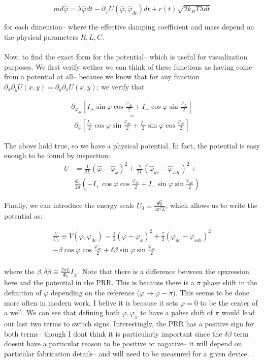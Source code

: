 \documentclass[paper=a4, twocolumn, fontsize=10pt]{article} %
\numberwithin{equation}{section} %
\numberwithin{figure}{section} %
\numberwithin{table}{section} %
\def \df#1{\hat{#1}}
\begin{document}
\[ m d \dot{\df\varphi} = \lambda \dot{\df\varphi} dt - \partial_{\df\varphi} U(\df\varphi, \df\varphi_{dc}) dt + r(t) \sqrt{2 k_B T \lambda dt} \]

for each dimension-- where the effective damping coefficient and mass depend on the physical parameters $R,L,C$.
\\
\\
Now, to find the exact form for the potential-- which is useful for visualization purposes. We first verify wether we can think of these functions as having come from a potential at all-- because we know that for any function $\partial_{x} \partial_{y} U(x,y) = \partial_{y} \partial_{x} U(x,y)$; we verify that

\begin{align}
 \partial_{\df\varphi_{dc}}\left[I_{+} \sin \varphi \cos \frac{\varphi_{dc}}{2} + I_{-} \cos \varphi \sin \frac{\varphi_{dc}}{2}\right]
\end{align}
\[=\]
\begin{align} 
    \partial_{\df\varphi}\left[\frac{I_{+}}{2} \cos \varphi \sin \frac{\varphi_{dc}}{2} + \frac{I_{-}}{2} \sin \varphi \cos \frac{\varphi_{dc}}{2}\right]
\end{align}

The above hold true, so we have a physical potential. In fact, the potential is easy enough to be found by inspection: 
\begin{align}
U &= \frac{1}{2L} (\df\varphi-\df\varphi_x)^2 + \frac{\gamma}{2L} (\df\varphi_{dc}-\df\varphi_{xdc})^2 + \\
 &\frac{\Phi_0}{2\pi}  \left( - I_+ \cos \varphi \cos \frac{\varphi_{dc}}{2} + I_- \sin \varphi \sin \frac{\varphi_{dc}}{2}\right)
\end{align}

Finally, we can introduce the energy scale $U_0 = \frac{ \Phi_0^2}{4\pi^2 L} $, which allows us to write the potential as:

\begin{align}
    \frac{U}{U_0} \equiv V(\varphi, \varphi_{dc}) =  \frac{1}{2} (\varphi-\varphi_x)^2 + \frac{\gamma}{2} (\varphi_{dc}-\varphi_{xdc})^2
    \\
     - \beta \cos \varphi \cos \frac{\varphi_{dc}}{2} + \delta\beta \sin \varphi \sin \frac{\varphi_{dc}}{2}
    \\
\end{align}

where the $\beta,\delta\beta \equiv \frac{2\pi L}{\Phi_0} I_{\pm}$. Note that there is a difference between the epxression here and the potential in the PRR. This is because there is a $\pi$ phase shift in the definition of $\varphi$ depending on the reference ($\varphi \to \varphi-\pi$). This seems to be done more often in modern work, I belive it is because it sets $\varphi=0$ to be the center of a well. We can see that defining both $\varphi,\varphi_{x}$ to have a pahse shift of $\pi$ would lead our last two terms to switch signs. Interestingly, the PRR has a positive sign for both terms-- though I dont think it is particularly important since the $\delta\beta$ term doesnt have a particular reason to be positive or nagative-- it will depend on particular fabrication details-- and will need to be measured for a given device.
\end{document}
